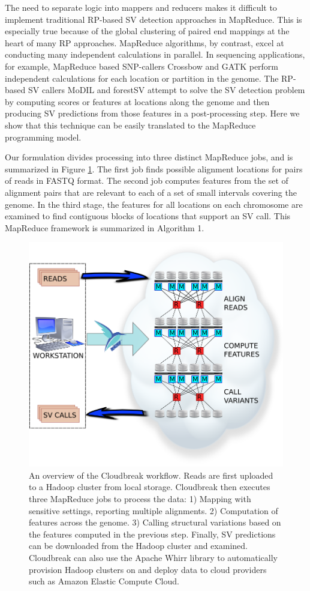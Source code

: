 \documentclass[11pt]{article}
\begin{document}
The need to separate logic into mappers and reducers makes it difficult to implement traditional RP-based SV detection approaches in MapReduce. This is especially true because of the global clustering of paired end mappings at the heart of many RP approaches. MapReduce algorithms, by contrast, excel at conducting many independent calculations in parallel. In sequencing applications, for example, MapReduce based SNP-callers Crossbow \autocite{Langmead:2009p1225} and GATK \autocite{McKenna:2010p1051} perform independent calculations for each location or partition in the genome. The RP-based SV callers MoDIL \autocite{Lee:2009da} and forestSV \autocite{Michaelson:2012fj} attempt to solve the SV detection problem by computing scores or features at locations along the genome and then producing SV predictions from those features in a post-processing step. Here we show that this technique can be easily translated to the MapReduce programming model.

Our formulation divides processing into three distinct MapReduce jobs, and is summarized in Figure \ref{cloudbreak_workflow}. The first job finds possible alignment locations for pairs of reads in FASTQ format. The second job computes features from the set of alignment pairs that are relevant to each of a set of small intervals covering the genome. In the third stage, the features for all locations on each chromosome are examined to find contiguous blocks of locations that support an SV call. This MapReduce framework is summarized in Algorithm 1.

\begin{figure}
\centering
\includegraphics[width=.8\textwidth]{../figures/workflow_with_whirr.png}
\caption{An overview of the Cloudbreak workflow. Reads are first uploaded to a Hadoop cluster from local storage. Cloudbreak then executes three MapReduce jobs to process the data: 1) Mapping with sensitive settings, reporting multiple alignments. 2) Computation of features across the genome. 3) Calling structural variations based on the features computed in the previous step. Finally, SV predictions can be downloaded from the Hadoop cluster and examined. Cloudbreak can also use the Apache Whirr library to automatically provision Hadoop clusters on and deploy data to cloud providers such as Amazon Elastic Compute Cloud.}
\label{cloudbreak_workflow}
\end{figure}
\end{document}

